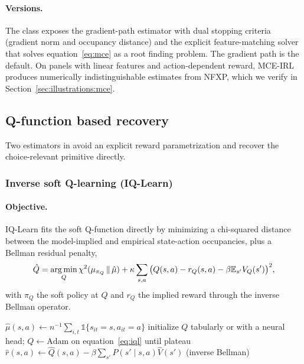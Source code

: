 \paragraph{Versions.} The  class exposes the gradient-path estimator with dual stopping criteria (gradient norm and occupancy distance) and the explicit feature-matching solver that solves equation~\eqref{eq:mce} as a root finding problem. The gradient path is the default. On panels with linear features and action-dependent reward, MCE-IRL produces numerically indistinguishable estimates from NFXP, which we verify in Section~\ref{sec:illustrations:mce}.

\subsection{Q-function based recovery}

Two estimators in  avoid an explicit reward parametrization and recover the choice-relevant primitive directly.

\subsubsection{Inverse soft Q-learning (IQ-Learn)}

\paragraph{Objective.} IQ-Learn \citep{garg2021} fits the soft Q-function directly by minimizing a chi-squared distance between the model-implied and empirical state-action occupancies, plus a Bellman residual penalty,
\begin{equation}
\hat Q = \operatorname*{arg\,min}_{Q} \chi^2(\mu_{\pi_Q} \,\|\, \hat\mu) + \kappa \sum_{s, a} \big( Q(s, a) - r_Q(s, a) - \beta \mathbb{E}_{s'} V_Q(s') \big)^2,
\label{eq:iql}
\end{equation}
with $\pi_Q$ the soft policy at $Q$ and $r_Q$ the implied reward through the inverse Bellman operator.

\begin{algorithm}[H]
\SetAlgoLined
$\hat\mu(s, a) \leftarrow n^{-1} \sum_{i,t} \mathbb{1}\{s_{it} = s, a_{it} = a\}$\;
initialize $Q$ tabularly or with a neural head; $Q \leftarrow \mathrm{Adam}$ on equation~\eqref{eq:iql} until plateau\;
$\hat r(s, a) \leftarrow \hat Q(s, a) - \beta \sum_{s'} P(s' \mid s, a) \hat V(s')$ \quad (inverse Bellman)\;
\caption{Inverse soft Q-learning}
\end{algorithm}

